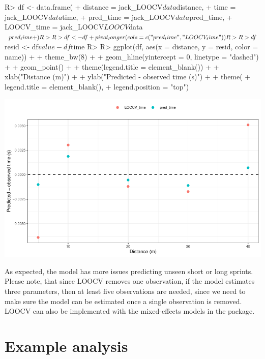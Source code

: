 \documentclass[
]{jss}
\begin{document}
\begin{CodeChunk}
\begin{CodeInput}
R> df <- data.frame(
+   distance = jack_LOOCV$data$distance,
+   time = jack_LOOCV$data$time,
+   pred_time = jack_LOOCV$data$pred_time,
+   LOOCV_time = jack_LOOCV$LOOCV$data$pred_time
+ )
R> 
R> df <- df %
+   pivot_longer(cols = c("pred_time", "LOOCV_time"))
R> 
R> df$resid <- df$value - df$time
R> 
R> ggplot(df, aes(x = distance, y = resid, color = name)) +
+   theme_bw(8) +
+   geom_hline(yintercept = 0, linetype = "dashed") +
+   geom_point() +
+   theme(legend.title = element_blank()) +
+   xlab("Distance (m)") +
+   ylab("Predicted - observed time (s)") +
+   theme(
+     legend.title = element_blank(),
+     legend.position = "top")
\end{CodeInput}


\begin{center}\includegraphics[width=1\linewidth]{paper_files/figure-latex/unnamed-chunk-47-1} \end{center}

\end{CodeChunk}

As expected, the model has more issues predicting unseen short or long sprints. Please note, that since LOOCV removes one observation, if the model estimates three parameters, then at least five observations are needed, since we need to make sure the model can be estimated once a single observation is removed. LOOCV can also be implemented with the mixed-effects models in the  package.

\hypertarget{example-analysis}{%
\section{Example analysis}\label{example-analysis}}
\end{document}
